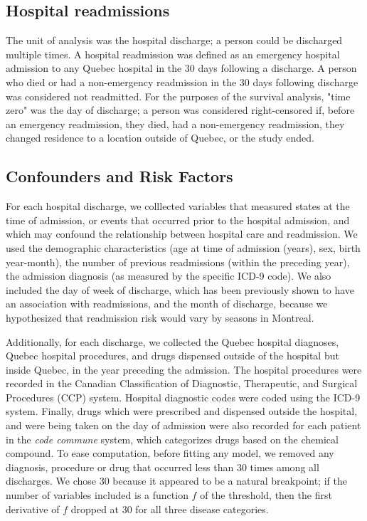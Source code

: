 \documentclass[]{article}\usepackage[]{graphicx}\usepackage[]{color}
\begin{document}
\subsection{Hospital readmissions}
The unit of analysis was the hospital discharge; a person could be discharged multiple times. A hospital readmission was defined as an emergency hospital admission to any Quebec hospital in the 30 days following a discharge.  A person who died or had a non-emergency readmission in the 30 days following discharge was considered not readmitted. For the purposes of the survival analysis, "time zero" was the day of discharge; a person was considered right-censored if, before an emergency readmission, they died, had a non-emergency readmission, they changed residence to a location outside of Quebec, or the study ended. 

\subsection{Confounders and Risk Factors}
For each hospital discharge, we colllected variables that measured states at the time of admission, or events that occurred prior to the hospital admission, and which may confound the relationship between hospital care and readmission. We used the demographic characteristics (age at time of admission (years), sex, birth year-month), the number of previous readmissions (within the preceding year), the admission diagnosis (as measured by the specific ICD-9 code). We also included the day of week of discharge, which has been previously shown to have an association with readmissions\supercite{van_walraven_risk_2002}, and the month of discharge, because we hypothesized that readmission risk would vary by seasons in Montreal.

Additionally, for each discharge, we collected the Quebec hospital diagnoses, Quebec hospital procedures, and drugs dispensed outside of the hospital but inside Quebec, in the year preceding the admission. The hospital procedures were recorded in the Canadian Classification of Diagnostic, Therapeutic, and Surgical Procedures (CCP) system. Hospital diagnostic codes were coded using the ICD-9 system. Finally, drugs which were prescribed and dispensed outside the hospital, and were being taken on the day of admission were also recorded for each patient in the \emph{code commune} system, which categorizes drugs based on the chemical compound. To ease computation, before fitting any model, we removed any diagnosis, procedure or drug that occurred less than 30 times among all discharges. We chose 30 because it appeared to be a natural breakpoint; if the number of variables included is a function $f$ of the threshold, then the first derivative of $f$ dropped at 30 for all three disease categories.
\end{document}
